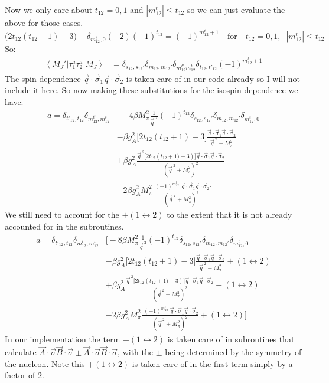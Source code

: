\documentclass[11pt]{article}
\newcommand{\br}[1]{\left\langle #1 \right |}
\newcommand{\kt}[1]{\left| #1 \right \rangle}
\newcommand{\ot}{_{12}}
\newcommand{\tot}{t_{12}}
\newcommand{\totp}{t'_{12}}
\newcommand{\sq}{^{\,2}}
\begin{document}
Now we only care about $t_{12}=0,1$ and $|m^t\ot|\leq t\ot$ so we can just evaluate the above for those cases.
\begin{equation}
    \big( 2 t_{12} \left( \tot+1 \right) -3\big) - \delta_{m_{12}^t ,0} \left( -2 \right) (-1)^{t_{12}}= (-1)^{m\ot^t+1}\quad
    \text{for}\quad t_{12}=0,1,\;\;|m^t\ot|\leq t\ot
\end{equation}
So:
\begin{align}
    \br{M_J'}\tau_1^a \tau_2^a \kt{M_J}&= \delta_{s\ot,s\ot'}\delta_{m\ot,m\ot'}\delta_{m_{12}^{t'}{m_{12}^{t}}} \delta_{\tot,\totp} (-1)^{m^t\ot+1}
\end{align}
The spin dependence $\vec{q}\cdot \vec{\sigma}_1 \vec{q}\cdot \vec{\sigma}_2$ is taken care of in our code already so I will not include it here. So now making these substitutions for the isospin dependence we have:
\begin{align}
    a=\delta_{t'_{12},t_{12}} \delta_{m^{t'}\ot, m^t\ot}&\Bigg[ -4 \beta M_\pi^2 
        \frac{1}{\vec{q}\sq}(-1)^{t\ot}\delta_{s\ot,s\ot'}\delta_{m_{12},m\ot'}\delta_{m^t_{12},0}\nonumber\\
     &-\beta g_A^2 \Big[ 2 t\ot (t\ot+1)-3 \Big] \frac{\vec{q} \cdot \vec{\sigma}_{1} \vec{q} \cdot
     \vec{\sigma}_{2}}{\vec{q}\sq+M_\pi^2}\nonumber\\
          &+\beta g_A^2\frac{\vec{q}\sq \Big[2 t\ot \left( t\ot+1)-3 \right) \Big]\vec{q} \cdot \vec{\sigma}_{1} \vec{q}\cdot \vec{\sigma}_{2}}{\left(\vec{q}\sq+M_\pi^2\right)^2}\nonumber\\
          &-2\beta g_A^2 M_\pi^2\frac{\;(-1)^{m^t_{12}}\; \vec{q} \cdot \vec{\sigma}_{1} \vec{q}\cdot \vec{\sigma}_{2}}{\left(\vec{q}\sq+M_\pi^2\right)^2}\Bigg]
\end{align}
We still need to account for the $+(1\leftrightarrow2)$ to the extent that it is not already accounted for in the subroutines.
\begin{align}
    a=\delta_{t'_{12},t_{12}} \delta_{m^{t'}\ot, m^t\ot}&\Bigg[ -8 \beta M_\pi^2 
        \frac{1}{\vec{q}\sq}(-1)^{t\ot}\delta_{s\ot,s\ot'}\delta_{m_{12},m\ot'}\delta_{m^t_{12},0}\nonumber\\
     &-\beta g_A^2 \Big[ 2 t\ot (t\ot+1)-3 \Big] \frac{\vec{q} \cdot \vec{\sigma}_{1} \vec{q} \cdot
     \vec{\sigma}_{2}}{\vec{q}\sq+M_\pi^2}+(1\leftrightarrow2)\nonumber\\
          &+\beta g_A^2\frac{\vec{q}\sq \Big[2 t\ot \left( t\ot+1)-3 \right) \Big]\vec{q} \cdot \vec{\sigma}_{1} \vec{q}\cdot \vec{\sigma}_{2}}{\left(\vec{q}\sq+M_\pi^2\right)^2}+(1\leftrightarrow2)\nonumber\\
          &-2\beta g_A^2 M_\pi^2\frac{\;(-1)^{m^t_{12}}\; \vec{q} \cdot \vec{\sigma}_{1} \vec{q}\cdot \vec{\sigma}_{2}}{\left(\vec{q}\sq+M_\pi^2\right)^2}+(1\leftrightarrow2)\Bigg]
\end{align}
In our implementation the term $+(1\leftrightarrow2)$ is taken care of in subroutines that calculate $\vec{A} \cdot \vec{\sigma}\vec{B} \cdot \vec{\sigma}\pm\vec{A} \cdot \vec{\sigma}\vec{B} \cdot \vec{\sigma}$, with the $\pm$ being determined by the symmetry of the nucleon.
Note this $+(1\leftrightarrow2)$ is taken care of in the first term simply by a factor of 2.
\end{document}
